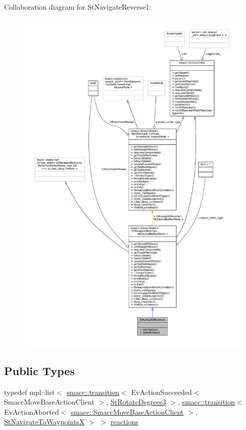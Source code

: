 Collaboration diagram for St\+Navigate\+Reverse1\+:
\nopagebreak
\begin{figure}[H]
\begin{center}
\leavevmode
\includegraphics[width=350pt]{structStNavigateReverse1__coll__graph}
\end{center}
\end{figure}
\subsection*{Public Types}
\begin{DoxyCompactItemize}
\item 
typedef mpl\+::list$<$ \hyperlink{classsmacc_1_1transition}{smacc\+::transition}$<$ Ev\+Action\+Succeeded$<$ Smacc\+Move\+Base\+Action\+Client $>$, \hyperlink{structStRotateDegrees3}{St\+Rotate\+Degrees3} $>$, \hyperlink{classsmacc_1_1transition}{smacc\+::transition}$<$ Ev\+Action\+Aborted$<$ \hyperlink{classsmacc_1_1SmaccMoveBaseActionClient}{smacc\+::\+Smacc\+Move\+Base\+Action\+Client} $>$, \hyperlink{structStNavigateToWaypointsX}{St\+Navigate\+To\+WaypointsX} $>$ $>$ \hyperlink{structStNavigateReverse1_a788570292e8d645a6305a4d3c268fd6f}{reactions}
\end{DoxyCompactItemize}
